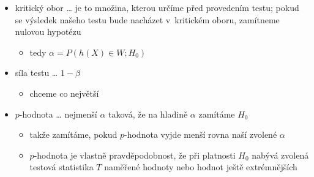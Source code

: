 \begin{itemize}
\begin{itemize}
\item kritický obor \dots{} je to množina, kterou určíme před provedením testu; pokud se výsledek našeho testu bude nacházet v~kritickém oboru, zamítneme nulovou hypotézu
\begin{itemize}
\item tedy $\alpha=P(h(X)\in W; H_0)$
\end{itemize}
\item síla testu \dots{} $1-\beta$
\begin{itemize}
\item chceme co největší
\end{itemize}
\item $p$-hodnota \dots{} nejmenší $\alpha$ taková, že na hladině $\alpha$ zamítáme $H_0$
\begin{itemize}
\item takže zamítáme, pokud $p$-hodnota vyjde menší rovna naší zvolené $\alpha$
\item $p$-hodnota je vlastně pravděpodobnost, že při platnosti $H_0$ nabývá zvolená testová statistika $T$ naměřené hodnoty nebo hodnot ještě extrémnějších
\end{itemize}
\end{itemize}
\end{itemize}
